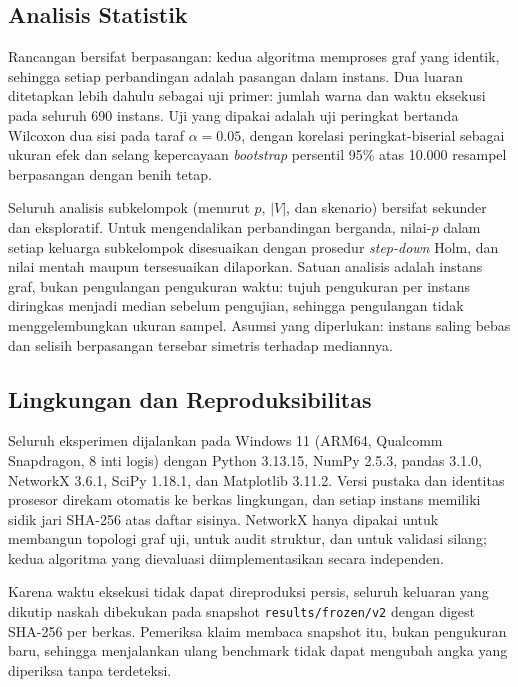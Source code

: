 \documentclass[conference,a4paper]{IEEEtran}
\begin{document}
\subsection{Analisis Statistik}
Rancangan bersifat berpasangan: kedua algoritma memproses graf yang identik,
sehingga setiap perbandingan adalah pasangan dalam instans. Dua luaran
ditetapkan lebih dahulu sebagai uji primer: jumlah warna dan waktu eksekusi pada
seluruh 690 instans. Uji yang dipakai adalah uji peringkat bertanda Wilcoxon dua
sisi pada taraf $\alpha=0.05$, dengan korelasi peringkat-biserial sebagai ukuran
efek dan selang kepercayaan \emph{bootstrap} persentil 95\% atas 10.000 resampel
berpasangan dengan benih tetap.

Seluruh analisis subkelompok (menurut $p$, $|V|$, dan skenario) bersifat
sekunder dan eksploratif. Untuk mengendalikan perbandingan berganda, nilai-$p$
dalam setiap keluarga subkelompok disesuaikan dengan prosedur \emph{step-down}
Holm, dan nilai mentah maupun tersesuaikan dilaporkan. Satuan analisis adalah
instans graf, bukan pengulangan pengukuran waktu: tujuh pengukuran per instans
diringkas menjadi median sebelum pengujian, sehingga pengulangan tidak
menggelembungkan ukuran sampel. Asumsi yang diperlukan: instans saling bebas
dan selisih berpasangan tersebar simetris terhadap mediannya.

\subsection{Lingkungan dan Reproduksibilitas}
Seluruh eksperimen dijalankan pada Windows 11 (ARM64, Qualcomm Snapdragon,
8 inti logis) dengan Python 3.13.15, NumPy 2.5.3, pandas 3.1.0, NetworkX 3.6.1,
SciPy 1.18.1, dan Matplotlib 3.11.2. Versi pustaka dan identitas prosesor
direkam otomatis ke berkas lingkungan, dan setiap instans memiliki sidik jari
SHA-256 atas daftar sisinya. NetworkX hanya dipakai untuk membangun topologi
graf uji, untuk audit struktur, dan untuk validasi silang; kedua algoritma yang
dievaluasi diimplementasikan secara independen.

Karena waktu eksekusi tidak dapat direproduksi persis, seluruh keluaran yang
dikutip naskah dibekukan pada snapshot \texttt{results/frozen/v2} dengan digest
SHA-256 per berkas. Pemeriksa klaim membaca snapshot itu, bukan pengukuran baru,
sehingga menjalankan ulang benchmark tidak dapat mengubah angka yang diperiksa
tanpa terdeteksi.
\end{document}
